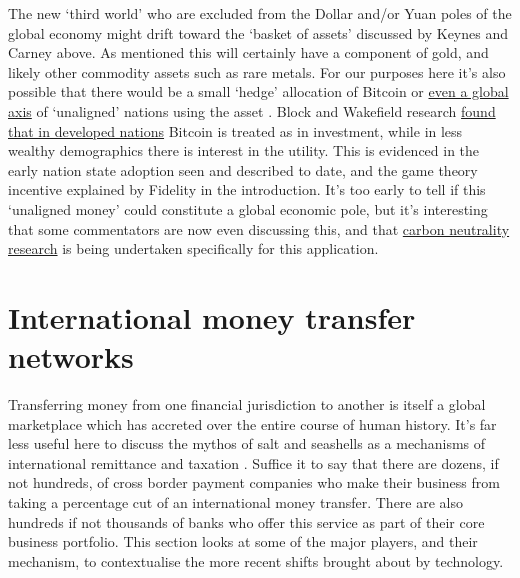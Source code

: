The new `third world' who are excluded from the Dollar and/or Yuan poles of the global economy might drift toward the `basket of assets' discussed by Keynes and Carney above. As mentioned this will certainly have a component of gold, and likely other commodity assets such as rare metals. For our purposes here it's also possible that there would be a small `hedge' allocation of Bitcoin or \href{https://www.independent.co.uk/tech/bitcoin-el-salvador-crypto-btc-b2079881.html}{even a global axis} of `unaligned' nations using the asset \cite{hendrickson2021value}. Block and Wakefield research \href{https://block.xyz/2022/btc-report.pdf}{found that in developed nations} Bitcoin is treated as in investment, while in less wealthy demographics there is interest in the utility. This is evidenced in the early nation state adoption seen and described to date, and the game theory incentive explained by Fidelity in the introduction. It's too early to tell if this `unaligned money' could constitute a global economic pole, but it's interesting that some commentators are now even discussing this, and that \href{https://docs.google.com/document/d/1Ynl5bbdTqev-wbTAWQoeWdh1cJVf3ortuSjre9K9wGQ/edit}{carbon neutrality research} is being undertaken specifically for this application.

\section{International money transfer networks}
Transferring money from one financial jurisdiction to another is itself a global marketplace which has accreted over the entire course of human history. It's far less useful here to discuss the mythos of salt and seashells as a mechanisms of international remittance and taxation \cite{gainsford2017salt, goldberg2005famous}. Suffice it to say that there are dozens, if not hundreds, of cross border payment companies who make their business from taking a percentage cut of an international money transfer. There are also hundreds if not thousands of banks who offer this service as part of their core business portfolio. This section looks at some of the major players, and their mechanism, to contextualise the more recent shifts brought about by technology.

